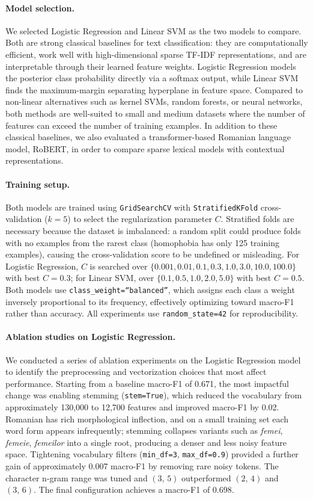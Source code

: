 \paragraph{Model selection.}
We selected Logistic Regression and Linear SVM as the two models to compare. Both are strong classical baselines for text classification: they are computationally efficient, work well with high-dimensional sparse TF-IDF representations, and are interpretable through their learned feature weights. Logistic Regression models the posterior class probability directly via a softmax output, while Linear SVM finds the maximum-margin separating hyperplane in feature space. Compared to non-linear alternatives such as kernel SVMs, random forests, or neural networks, both methods are well-suited to small and medium datasets where the number of features can exceed the number of training examples. In addition to these classical baselines, we also evaluated a transformer-based Romanian language model, RoBERT, in order to compare sparse lexical models with contextual representations.

\paragraph{Training setup.}
Both models are trained using \texttt{GridSearchCV} with \texttt{StratifiedKFold} cross-validation ($k=5$) to select the regularization parameter $C$. Stratified folds are necessary because the dataset is imbalanced: a random split could produce folds with no examples from the rarest class (homophobia has only 125 training examples), causing the cross-validation score to be undefined or misleading. For Logistic Regression, $C$ is searched over $\{0.001, 0.01, 0.1, 0.3, 1.0, 3.0, 10.0, 100.0\}$ with best $C=0.3$; for Linear SVM, over $\{0.1, 0.5, 1.0, 2.0, 5.0\}$ with best $C=0.5$. Both models use \texttt{class\_weight=``balanced''}, which assigns each class a weight inversely proportional to its frequency, effectively optimizing toward macro-F1 rather than accuracy. All experiments use \texttt{random\_state=42} for reproducibility.

\paragraph{Ablation studies on Logistic Regression.}
We conducted a series of ablation experiments on the Logistic Regression model to identify the preprocessing and vectorization choices that most affect performance. Starting from a baseline macro-F1 of 0.671, the most impactful change was enabling stemming (\texttt{stem=True}), which reduced the vocabulary from approximately 130,000 to 12,700 features and improved macro-F1 by 0.02. Romanian has rich morphological inflection, and on a small training set each word form appears infrequently; stemming collapses variants such as \textit{femei}, \textit{femeie}, \textit{femeilor} into a single root, producing a denser and less noisy feature space. Tightening vocabulary filters (\texttt{min\_df=3}, \texttt{max\_df=0.9}) provided a further gain of approximately 0.007 macro-F1 by removing rare noisy tokens. The character n-gram range was tuned and $(3,\,5)$ outperformed $(2,\,4)$ and $(3,\,6)$. The final configuration achieves a macro-F1 of 0.698.

